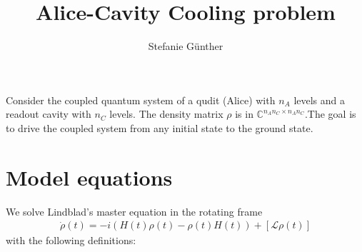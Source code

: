 \documentclass[letterpaper]{article}
\title{Alice-Cavity Cooling problem}
\author{Stefanie G{\"u}nther}
\newcommand{\Ell}{\mathcal{L}}
\newcommand{\C}{\mathds{C}}
\begin{document}
\maketitle

Consider the coupled quantum system of a qudit (Alice) with $n_A$ levels and a readout cavity with $n_C$ levels. The density matrix $\rho$ is in $\C^{n_An_C \times n_An_C}$.The goal is to drive the coupled system from any initial state to the ground state.

\section{Model equations}
We solve Lindblad's master equation in the rotating frame
\begin{align}
    \dot \rho(t) = -i \left(H(t)\rho(t) - \rho(t)H(t) \right) + [\Ell \rho(t)]
\end{align}
with the following definitions:
\end{document}
